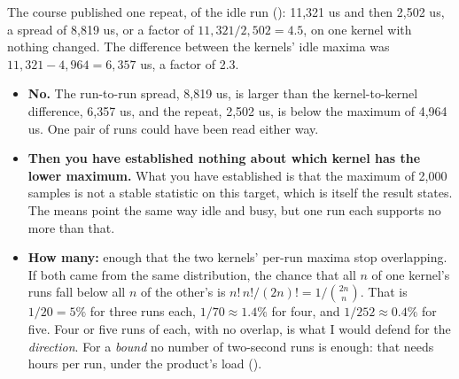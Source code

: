  The course published one repeat, of the idle  run ():
11,321 us and then 2,502 us, a spread of 8,819 us, or a factor of $11{,}321 / 2{,}502 = 4.5$, on one
kernel with nothing changed. The difference between the kernels' idle maxima was
$11{,}321 - 4{,}964 = 6{,}357$ us, a factor of 2.3.
\begin{itemize}
  \item \textbf{No.} The run-to-run spread, 8,819 us, is larger than the kernel-to-kernel difference,
    6,357 us, and the repeat, 2,502 us, is below the  maximum of 4,964 us. One pair
    of runs could have been read either way.
  \item \textbf{Then you have established nothing about which kernel has the lower maximum.} What you
    have established is that the maximum of 2,000 samples is not a stable statistic on this target,
    which is itself the result  states. The means point the same way idle and
    busy, but one run each supports no more than that.
  \item \textbf{How many:} enough that the two kernels' per-run maxima stop overlapping. If both came
    from the same distribution, the chance that all $n$ of one kernel's runs fall below all $n$ of
    the other's is $n!\,n!/(2n)! = 1/\binom{2n}{n}$. That is $1/20 = 5\%$ for three runs each,
    $1/70 \approx 1.4\%$ for four, and $1/252 \approx 0.4\%$ for five. Four or five runs of each, with
    no overlap, is what I would defend for the \emph{direction}. For a \emph{bound} no number of
    two-second runs is enough: that needs hours per run, under the product's load
    ().
\end{itemize}

